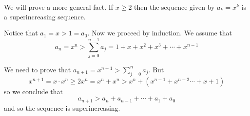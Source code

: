 \documentclass[12pt]{article}
\begin{document}
We will prove a more general fact. If $x\geq 2$ then the sequence
given by $a_k = x^k$ is a superincreasing sequence.

Notice that $a_1 = x > 1 = a_0$. Now we proceed by induction.
We assume that
\[
a_n = x^n > \sum_{j=0}^{n-1} a_{j} = 1+x+x^2 + x^3 + \cdots + x^{n-1}
\]

We need to prove that $a_{n+1} =x^{n+1} >  \sum_{j=0}^{n} a_{j}$. But
\[
x^{n+1} = x\cdot x^n \geq 2 x^n = x^n + x^n > x^n + (x^{n-1}+ x^{n-2}\cdots+x+1 )
\]
so we conclude that
\[
a_{n+1} > a_n + a_{n-1} + \cdots + a_1+ a_0
\]
and so the sequence is superincreasing.
\end{document}
